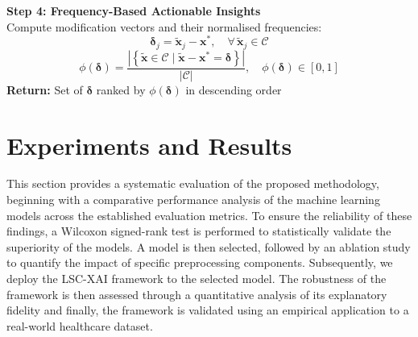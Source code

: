 \documentclass[a4paper,fleqn]{cas-sc}
\begin{document}
\begin{algorithm}[H]
\vspace{1mm}
\textbf{Step 4: Frequency-Based Actionable Insights}\\
Compute modification vectors and their normalised frequencies:
\begin{equation*}
    \boldsymbol{\delta}_j = \tilde{\mathbf{x}}_j - \mathbf{x}^*, \quad \forall\, \tilde{\mathbf{x}}_j \in \mathcal{C}
\end{equation*}
\begin{equation*}
    \phi(\boldsymbol{\delta}) = 
    \frac{\left|\left\{\tilde{\mathbf{x}} \in \mathcal{C} \mid \tilde{\mathbf{x}} - \mathbf{x}^* = \boldsymbol{\delta}\right\}\right|}{|\mathcal{C}|}, 
    \quad \phi(\boldsymbol{\delta}) \in [0,1]
\end{equation*}
\vspace{1mm}
\textbf{Return:} Set of $\boldsymbol{\delta}$ ranked by $\phi(\boldsymbol{\delta})$ in descending order
\end{algorithm}

\section{Experiments and Results}
\label{sec:exp}
This section provides a systematic evaluation of the proposed methodology, beginning with a comparative performance analysis of the machine learning models across the established evaluation metrics. To ensure the reliability of these findings, a Wilcoxon signed-rank test is performed to statistically validate the superiority of the models. A model is then selected, followed by an ablation study to quantify the impact of specific preprocessing components. Subsequently, we deploy the LSC-XAI framework to the selected model. The robustness of the framework is then assessed through a quantitative analysis of its explanatory fidelity and finally, the framework is validated using an empirical application to a real-world healthcare dataset.
\end{document}
